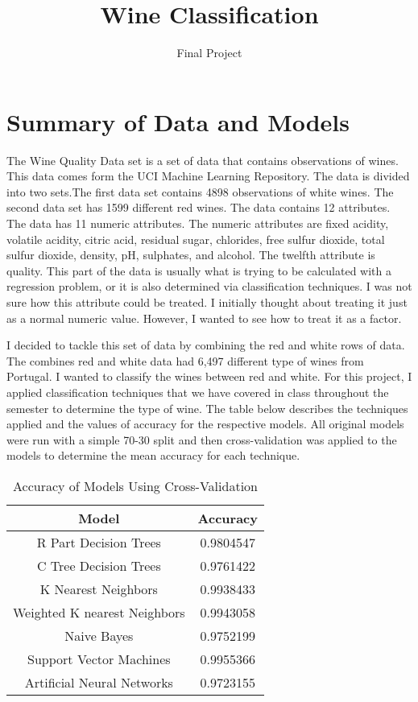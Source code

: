 \documentclass[letterpaper]{article}\usepackage[]{graphicx}\usepackage[]{color}
\title{Wine Classification}
\subtitle{Final Project}
\begin{document}
\linenumbers

\section*{Summary of Data and Models}
The Wine Quality Data set is a set of data that contains observations of wines. This data comes form the UCI Machine Learning Repository. The data is divided into two sets.The first data set contains 4898 observations of white wines. The second data set has 1599 different red wines. The data contains 12 attributes. The data has 11 numeric attributes. The numeric attributes are fixed acidity, volatile acidity, citric acid, residual sugar, chlorides, free sulfur dioxide, total sulfur dioxide, density, pH, sulphates, and alcohol. The twelfth attribute is quality. This part of the data is usually what is trying to be calculated with a regression problem, or it is also determined via classification techniques. I was not sure how this attribute could be treated. I initially thought about treating it just as a normal numeric value. However, I wanted to see how to treat it as a factor.

I decided to tackle this set of data by combining the red and white rows of data. The combines red and white data had 6,497 different type of wines from Portugal. I wanted to classify the wines between red and white.  For this project, I applied classification techniques that we have covered in class throughout the semester to determine the type of wine. The table below describes the techniques applied and the values of accuracy for the respective models. All original models were run with a simple 70-30 split and then cross-validation was applied to the models to determine the mean accuracy for each technique.
\begin{table}[ht]
\caption{Accuracy of Models Using Cross-Validation}
\centering 
\begin{tabular}{c c } 
\hline\hline 
Model & Accuracy \\ [0.5ex]
\hline
R Part Decision Trees & 0.9804547  \\ 
C Tree Decision Trees & 0.9761422  \\
K Nearest Neighbors & 0.9938433  \\
Weighted K nearest Neighbors & 0.9943058  \\
Naive Bayes & 0.9752199  \\ 
Support Vector Machines & 0.9955366  \\
Artificial Neural Networks & 0.9723155  \\[1ex] 
\hline 
\end{tabular}
\end{table}
\end{document}
